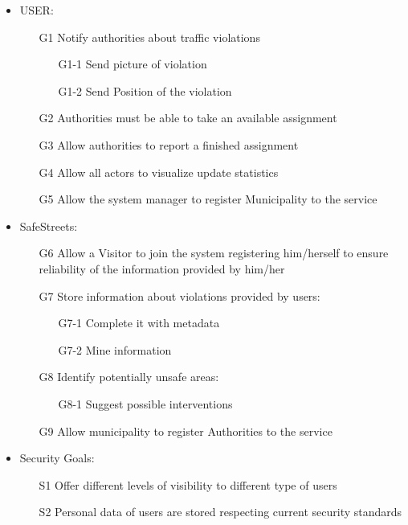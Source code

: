 \begin{itemize}
\item	USER:
\begin{itemize}
\item[G1] Notify authorities about traffic violations
\begin{itemize}
\item[G1-1] Send picture of violation
\item[G1-2] Send Position of the violation
\end{itemize}
\item[G2]Authorities must be able to take an available assignment
\item[G3] Allow authorities to report a finished assignment
\item[G4]Allow all actors to visualize update statistics
\item[G5] Allow the system manager to register Municipality to the service
\end{itemize}
\item	SafeStreets:
\begin{itemize}
\item[G6] Allow a Visitor to join the system registering him/herself to ensure reliability of the information provided by him/her
\item[G7] Store information about violations provided by users:
\begin{itemize}
\item[G7-1] Complete it with metadata
\item[G7-2] Mine information
\end{itemize}
\item[G8] Identify potentially unsafe areas:
\begin{itemize}
\item[G8-1] Suggest possible interventions
\end{itemize}
\item[G9] Allow municipality to register Authorities to the service
\end{itemize}
\item	Security Goals:
\begin{itemize}
\item[S1] Offer different levels of visibility to different type of users
\item[S2] Personal data of users are stored respecting current security standards
\end{itemize}
\end{itemize}
